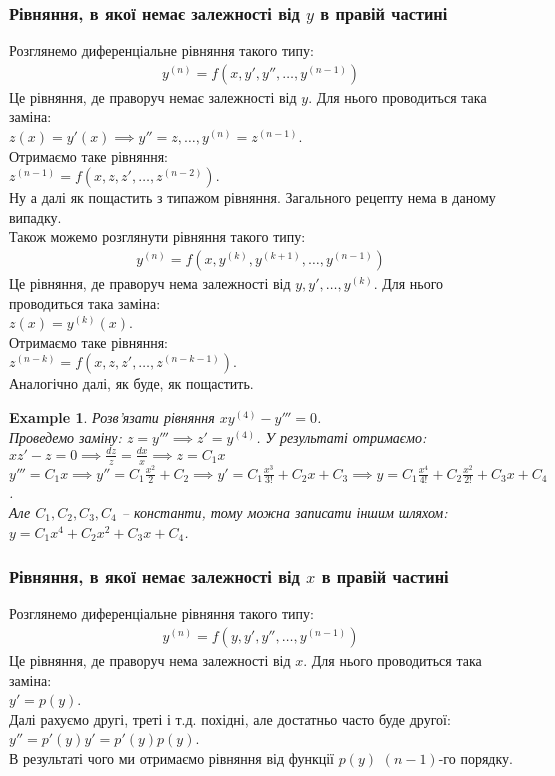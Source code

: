 \documentclass[a4paper, 10pt]{article}
\theoremstyle{theoremdd}
\theoremstyle{theoremdd}
\theoremstyle{theoremdd}
\theoremstyle{theoremdd}
\newtheorem{example}[theorem]{Example}
\theoremstyle{theoremdd}
\theoremstyle{theoremdd}
\theoremstyle{theoremdd}
\theoremstyle{theoremdd}
\begin{document}
	\subsubsection{Рівняння, в якої немає залежності від $y$ в правій частині}
	Розглянемо диференціальне рівняння такого типу:
	\begin{align*}
	y^{(n)} = f(x,y',y'',\dots, y^{(n-1)})
	\end{align*}
	Це рівняння, де праворуч немає залежності від $y$. Для нього проводиться така заміна: \\ $
	z(x) = y'(x) \implies y'' = z, \dots, y^{(n)} = z^{(n-1)}$.	\\
	Отримаємо таке рівняння:\\
	$z^{(n-1)}=f(x,z,z',\dots,z^{(n-2)})$.\\
	Ну а далі як пощастить з типажом рівняння. Загального рецепту нема в даному випадку.
	\bigskip \\
	Також можемо розглянути рівняння такого типу:
	\begin{align*}
	y^{(n)} = f(x,y^{(k)},y^{(k+1)},\dots, y^{(n-1)})
	\end{align*}
	Це рівняння, де праворуч нема залежності від $y,y',\dots,y^{(k)}$. Для нього проводиться така заміна: \\
	$z(x) = y^{(k)}(x)$.\\	
	Отримаємо таке рівняння:\\
	$z^{(n-k)}=f(x,z,z',\dots,z^{(n-k-1)})$.\\
	Аналогічно далі, як буде, як пощастить.
	
	\begin{example}
	Розв'язати рівняння $xy^{(4)} - y'''=0$.\\
	Проведемо заміну: $z = y''' \implies z' = y^{(4)}$. У результаті отримаємо:\\
	$xz'-z=0 \implies \displaystyle \frac{dz}{z} = \frac{dx}{x} \implies z = C_1x$\\
	$y''' = C_1x \implies \displaystyle y'' = C_1 \frac{x^2}{2} + C_2 \implies y' = C_1 \frac{x^3}{3!} + C_2x + C_3 \implies y = C_1 \frac{x^4}{4!} + C_2 \frac{x^2}{2!}+ C_3x + C_4$.\\
	Але $C_1,C_2,C_3,C_4$ -- константи, тому можна записати іншим шляхом:\\
	$y = C_1x^4 + C_2x^2 + C_3x + C_4$.
	\end{example}
	
	\subsubsection{Рівняння, в якої немає залежності від $x$ в правій частині}
	Розглянемо диференціальне рівняння такого типу:
	\begin{align*}
	y^{(n)} = f(y,y',y'',\dots, y^{(n-1)})
	\end{align*}
	Це рівняння, де праворуч нема залежності від $x$. Для нього проводиться така заміна: \\
	$y' = p(y)$.\\
	Далі рахуємо другі, треті і т.д. похідні, але достатньо часто буде другої:\\
	$y'' = p'(y)y'=p'(y)p(y)$.\\
	В результаті чого ми отримаємо рівняння від функції $p(y)$ $(n-1)$-го порядку.
	
\end{document}
